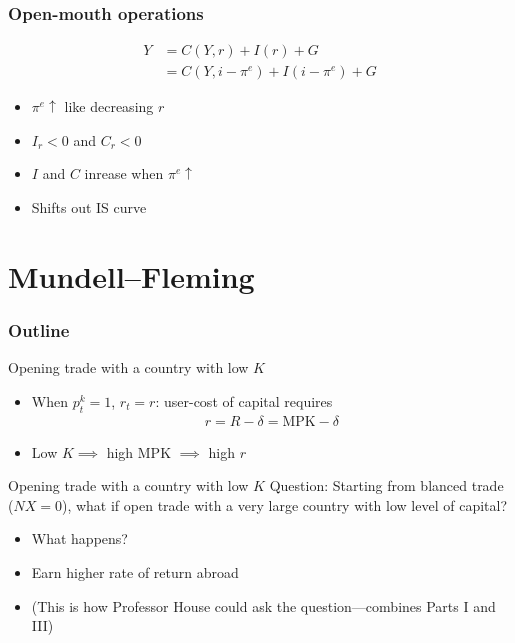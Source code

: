 \documentclass[presentation,dvipsnames]{beamer}
\begin{document}
\begin{frame}
\frametitle{Open-mouth operations}
\begin{align*}
Y &= C(Y,r) + I(r) + G \\
&= C(Y, i - \pi^{e}) + I(i-\pi^{e}) + G
\end{align*}
\begin{itemize}[label={--}]
\item $\pi^{e} \uparrow$ like decreasing $r$
\item $I_{r} < 0$ and $C_{r} < 0$
\item $I$ and $C$ inrease when $\pi^{e} \uparrow$
\item Shifts out IS curve
\end{itemize}
\end{frame}


\section{Mundell--Fleming}
\label{sec-6}

\begin{frame}
\frametitle{Outline}
\tableofcontents[currentsection]
\end{frame}

\begin{frame}[label=sec-6-1]{Opening trade with a country with low $K$}
\begin{itemize}[label={--}]
\item When $p^{k}_{t} = 1$, $r_{t} = r$: user-cost of capital requires
\begin{align*}
r = R - \delta = \text{MPK} - \delta
\end{align*}
\item Low $K \implies$ high $\text{MPK}$ $\implies$ high $r$
\end{itemize}
\end{frame}

\begin{frame}[label=sec-6-1]{Opening trade with a country with low $K$}
Question: \textcolor{RubineRed}{Starting from blanced trade ($NX = 0$),
what if open trade with a very large country with low level of capital?}
\begin{itemize}[label={--}]
\item What happens?
\item Earn higher rate of return abroad
\item (This is how Professor House could ask the question---combines Parts I and III)
\end{itemize}
\end{frame}
\end{document}
